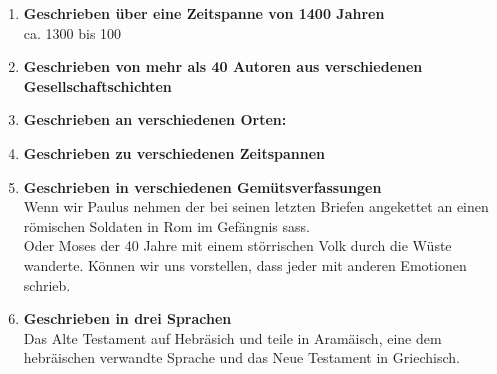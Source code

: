 \documentclass[fontsize=16pt]{mybib}
\begin{document}
\begin{otsblock}
    \begin{enumerate}
        \item \textbf{Geschrieben über eine Zeitspanne von 1400 Jahren}\\
        ca. 1300 \vChr{} bis 100\nChr{}
        \item \textbf{Geschrieben von mehr als 40 Autoren aus verschiedenen Gesellschaftschichten}
        \item \textbf{Geschrieben an verschiedenen Orten:}
        \item \textbf{Geschrieben zu verschiedenen Zeitspannen}
        \item \textbf{Geschrieben in verschiedenen Gemütsverfassungen}\\
        Wenn wir Paulus nehmen der bei seinen letzten Briefen angekettet an einen römischen Soldaten in Rom im Gefängnis sass.\\
        Oder Moses der 40 Jahre mit einem störrischen Volk durch die Wüste wanderte. Können wir uns vorstellen, dass jeder mit anderen Emotionen schrieb.
        \item \textbf{Geschrieben in drei Sprachen}\\
        Das Alte Testament auf Hebräsich und teile in Aramäisch, eine dem hebräischen verwandte Sprache und das Neue Testament in Griechisch.
    \end{enumerate}
\end{otsblock}
\end{document}
